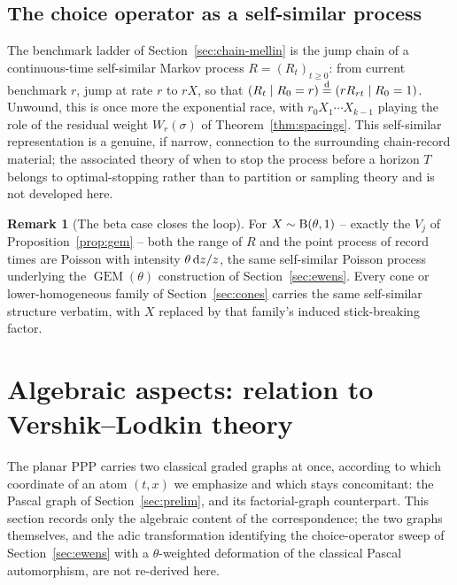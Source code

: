 \documentclass[11pt]{article}
\DeclareMathOperator{\GEM}{GEM}
\theoremstyle{plain}
\theoremstyle{definition}
\newtheorem{remark}[theorem]{Remark}
\begin{document}
\subsection{The choice operator as a self-similar process}
\label{sec:stopping}

The benchmark ladder of Section~\ref{sec:chain-mellin} is the jump chain of a
continuous-time self-similar Markov process \(R=(R_t)_{t\ge0}\): from current
benchmark \(r\), jump at rate \(r\) to \(rX\), so that
\((R_t\mid R_0=r)\stackrel{\rm d}=(rR_{rt}\mid R_0=1)\). Unwound, this is once
more the exponential race, with \(r_0X_1\cdots X_{k-1}\) playing the role of
the residual weight \(W_r(\sigma)\) of Theorem~\ref{thm:spacings}. This self-similar representation is a genuine, if narrow, connection to the surrounding chain-record material; the associated theory of when to stop the process before a horizon \(T\) \cite{GnedinLastRecord2006} belongs to optimal-stopping rather than to partition or sampling theory and is not developed here.

\begin{remark}[The beta case closes the loop]
For \(X\sim{\rm B}(\theta,1)\) -- exactly the \(V_j\) of
Proposition~\ref{prop:gem} -- both the
range of \(R\) and the point process of record times are Poisson with
intensity \(\theta\,{\rm d}z/z\), the same self-similar Poisson process
underlying the \(\GEM(\theta)\) construction of Section~\ref{sec:ewens}. Every cone or lower-homogeneous family of
Section~\ref{sec:cones} carries the same self-similar structure verbatim, with \(X\)
replaced by that family's induced stick-breaking factor.
\end{remark}

\section{Algebraic aspects: relation to Vershik--Lodkin theory}
\label{sec:vershik-lodkin}

The planar PPP carries two classical graded graphs at once, according to which coordinate of an atom \((t,x)\) we emphasize and which stays concomitant: the Pascal graph of Section~\ref{sec:prelim}, and its factorial-graph counterpart. This section records only the algebraic content of the correspondence; the two graphs themselves, and the adic transformation identifying the choice-operator sweep of Section~\ref{sec:ewens} with a \(\theta\)-weighted deformation of the classical Pascal automorphism, are not re-derived here.
\end{document}
